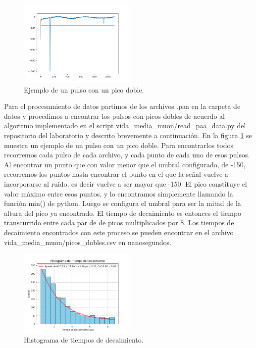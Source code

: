 \documentclass[twocolumn,a4paper,11pt]{scrartcl}
\begin{document}
\begin{figure}[h]
  \centering
  \includegraphics[width=0.5\textwidth]{pulse_plot.png}
  \caption{Ejemplo de un pulso con un pico doble.}
  \label{fig:pulse_plot}
\end{figure}

Para el procesamiento de datos partimos de los archivos .paa en la carpeta de datos \cite{CarpetaDatos} y procedimos a encontrar los pulsos con picos dobles de acuerdo al algoritmo implementado en el script vida\_media\_muon/read\_paa\_data.py del repositorio del laboratorio \cite{BrianDL_laboratorio} y descrito brevemente a continuación. 
En la figura \ref{fig:pulse_plot} se muestra un ejemplo de un pulso con un pico doble. Para encontrarlos todos recorremos cada pulso de cada archivo, y cada punto de cada uno de esos pulsos.
Al encontrar un punto que con valor menor que el umbral configurado, de -150, recorremos los puntos hasta encontrar el punto en el que la señal vuelve a incorporarse al ruido, es decir vuelve a ser mayor que -150. El pico constituye el valor máximo entre esos puntos, y lo encontramos simplemente llamando la función min() de python. Luego se configura el umbral para ser la mitad de la altura del pico ya encontrado. El tiempo de decaimiento es entonces el tiempo transcurrido entre cada par de de picos multiplicados por 8. Los tiempos de decaimiento encontrados con este proceso se pueden encontrar en el archivo vida\_media\_muon/picos\_dobles.csv en nanosegundos.

\begin{figure}[h]
  \centering
  \includegraphics[width=0.5\textwidth]{histograma.png}
  \caption{Histograma de tiempos de decaimiento.}
  \label{fig:histograma}
\end{figure}
\end{document}
